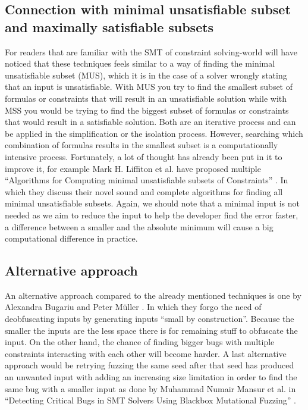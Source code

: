 \subsection{Connection with minimal unsatisfiable subset and maximally satisfiable subsets}
\label{inputReduction:MUS/MSS}
For readers that are familiar with the SMT of constraint solving-world will have noticed that these techniques feels similar to a way of finding the minimal unsatisfiable subset (MUS), which it is in the case of a solver wrongly stating that an input is unsatisfiable. 
With MUS you try to find the smallest subset of formulas or constraints that will result in an unsatisfiable solution while with 
MSS you would be trying to find the biggest subset of formulas or constraints that would result in a satisfiable solution. Both are an iterative process and can be applied in the simplification or the isolation process. However, searching which combination of formulas results in the smallest subset is a computationally intensive process. Fortunately, a lot of thought has already been put in it to improve it, for example Mark H. Liffiton et al. have proposed multiple “Algorithms for Computing minimal unsatisfiable subsets of Constraints” \cite{51liffiton2008algorithms}. In which they discuss their novel sound and complete algorithms for finding all minimal unsatisfiable subsets. Again, we should note that a minimal input is not needed as we aim to reduce the input to help the developer find the error faster, a difference between a smaller and the absolute minimum will cause a big computational difference in practice.

\subsection{Alternative approach}
\label{inputReduction:alt2deobfuscating}
An alternative approach compared to the already mentioned techniques is one by Alexandra Bugariu and Peter M\"uller \cite{9bugariu2020automaticallyTestingStringSolvers}. In which they forgo the need of deobfuscating inputs by generating inputs “small by construction”. 
Because the smaller the inputs are the less space there is for remaining stuff to obfuscate the input. On the other hand, the chance of finding bigger bugs with multiple constraints interacting with each other will become harder.
A last alternative approach would be retrying fuzzing the same seed after that seed has produced an unwanted input with adding an increasing size limitation in order to find the same bug with a smaller input as done by Muhammad Numair Mansur et al. in “Detecting Critical Bugs in SMT Solvers Using Blackbox Mutational Fuzzing” \cite{1mansur2020detecting}.

